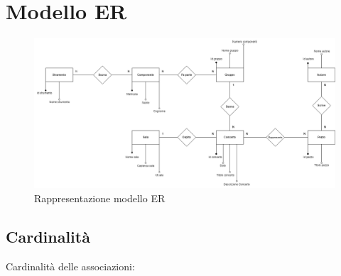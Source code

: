 \documentclass[12pt]{article}
\begin{document}
\clearpage


\section{Modello ER}
\begin{figure}[h!]
    \centering
    \includegraphics[width=16cm]{modello_er_concerto.png}
    \caption{Rappresentazione modello ER}
    \label{fig: modello er concerto}
\end{figure}


\subsection{Cardinalità}

\noindent
Cardinalità delle associazioni:
\end{document}
